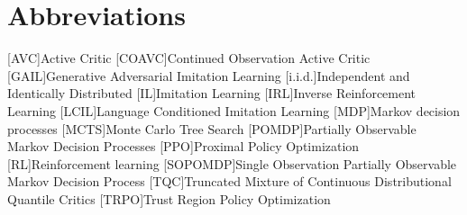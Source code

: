 
\chapter{Abbreviations}
\begin{acronym}
    [AVC]{Active Critic}
    [COAVC]{Continued Observation Active Critic}
    [GAIL]{Generative Adversarial Imitation Learning}
    [i.i.d.]{Independent and Identically Distributed}
    [IL]{Imitation Learning}
    [IRL]{Inverse Reinforcement Learning}
    [LCIL]{Language Conditioned Imitation Learning}
    [MDP]{Markov decision processes}
    [MCTS]{Monte Carlo Tree Search}
    [POMDP]{Partially Observable Markov Decision Processes}
    [PPO]{Proximal Policy Optimization}
    [RL]{Reinforcement learning}
    [SOPOMDP]{Single Observation Partially Observable Markov Decision Process}
    [TQC]{Truncated Mixture of Continuous Distributional Quantile Critics}
    [TRPO]{Trust Region Policy Optimization}
\end{acronym}
